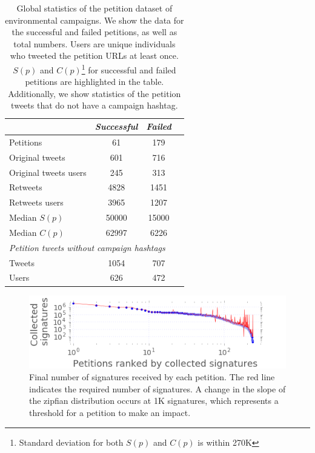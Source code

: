 \begin{table}[hbt!]
\centering
\begin{tabular}{lccc}
			& \textit{Successful} & \textit{Failed}	\\ \midrule
Petitions					& 61		& 179		\\
Original tweets				& 601		& 716		\\
Original tweets users 		& 245		& 313		\\
Retweets						& 4828		& 1451 		\\
Retweets users				& 3965		& 1207		\\
Median $S(p)$				& 50000		& 15000		\\
Median $C(p)$				& 62997		& 6226		\\
\multicolumn{3}{l}{\textit{Petition tweets without campaign hashtags}}	\\ \midrule
Tweets						& 1054		& 707		\\
Users 						& 626		& 472		\\
\end{tabular}
\caption{Global statistics of the petition dataset of environmental campaigns. We show the data for the successful and failed petitions, as well as total numbers. Users are unique individuals who tweeted the petition URLs at least once. $S(p)$ and $C(p)$\footnote{Standard deviation for both $S(p)$ and $C(p)$ is within 270K} for successful and failed petitions are highlighted in the table. Additionally, we show statistics of the petition tweets that do not have a campaign hashtag.}
\label{tab:petition_tweets}
\end{table}

\begin{figure}
\centering
\includegraphics[width=\columnwidth]{figures/petitionsVSrank.png}
\caption{Final number of signatures received by each petition. The red line indicates the required number of signatures. A change in the slope of the zipfian distribution occurs at 1K signatures, which represents a threshold for a petition to make an impact.}
\label{fig:signatures_vs_rank}
\end{figure}

